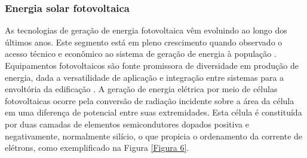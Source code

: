 \begin{onehalfspace}
    \subsubsection{Energia solar fotovoltaica}
    As tecnologias de geração de energia fotovoltaica vêm evoluindo ao longo dos últimos anos. 
    Este segmento está em pleno crescimento quando observado o acesso técnico e econômico ao sistema de 
    geração de energia à população \cite{Pereira2017}. Equipamentos fotovoltaicos são fonte promissora 
    de diversidade em produção de energia, dada a versatilidade de aplicação e integração entre 
    sistemas para a envoltória da edificação \cite{Sorgato2018}.\vspace{0.3cm} \newline
    A geração de energia elétrica por meio de células fotovoltaicas ocorre pela conversão de radiação 
    incidente sobre a área da célula em uma diferença de potencial entre suas extremidades. Esta célula 
    é constituída por duas camadas de elementos semicondutores dopados positiva e negativamente, 
    normalmente silício, o que propicia o ordenamento da corrente de elétrons, como exemplificado na 
    Figura \ref{Figura 6}.


\end{onehalfspace}
